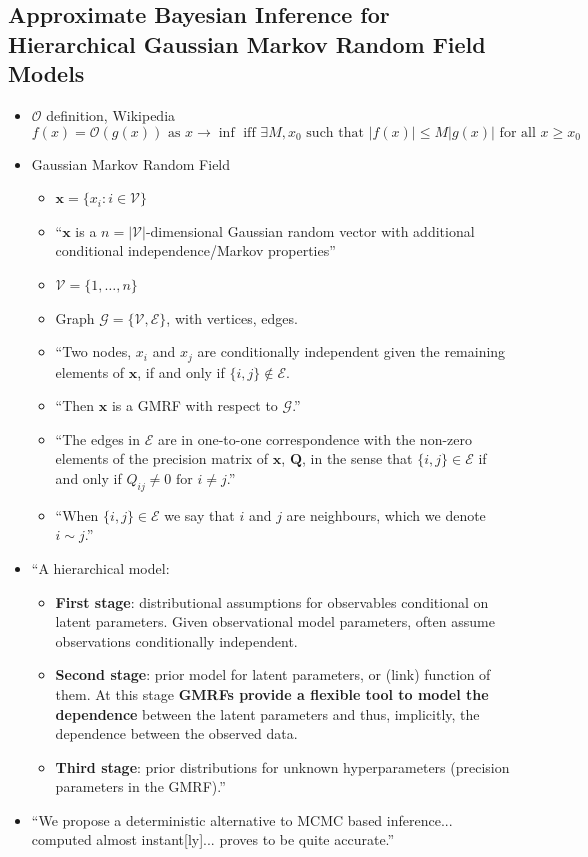\documentclass{article}
\begin{document}
\subsection*{Approximate Bayesian Inference for Hierarchical Gaussian Markov Random Field Models \citep{Rue2007}}
\begin{itemize}
\item $\mathcal{O}$ definition, Wikipedia
$$f(x) = \mathcal{O}(g(x)) \text{ as } x \rightarrow \inf \text{ iff } \exists M, x_{0} \text{ such that } |f(x)| \leq M|g(x)| \text{ for all } x \geq x_{0}$$
\item Gaussian Markov Random Field 
  \begin{itemize}
  \item $\pmb{x} = \{ x_{i}:i \in \mathscr{V} \}$
  \item ``$\pmb{x}$ is a $n = |\mathscr{V}|$-dimensional Gaussian random vector with additional conditional independence/Markov properties'' 
  \item $\mathscr{V} = \{1,\dots,n\}$
  \item Graph $\mathscr{G} = \{ \mathscr{V}, \mathscr{E} \}$, with vertices, edges.
  \item ``Two nodes, $x_{i}$ and $x_{j}$ are conditionally independent given the remaining elements of $\pmb{x}$, if and only if $\{i, j\} \notin \mathscr{E}$.
  \item ``Then $\pmb{x}$ is a GMRF with respect to $\mathscr{G}$.''
  \item ``The edges in $\mathscr{E}$ are in one-to-one correspondence with the non-zero elements of the precision matrix of $\pmb{x}$, $\pmb{Q}$, in the sense that $\{ i, j \} \in \mathscr{E}$ if and only if $Q_{ij} \neq 0 \text{ for } i \neq j$.''
  \item ``When $\{i,j\} \in \mathscr{E}$ we say that $i$ and $j$ are neighbours, which we denote $i \sim j$.''
  \end{itemize}
  
\item ``A hierarchical model:
  \begin{itemize}
  \item {\bf First stage}: distributional assumptions for observables conditional on latent parameters. Given observational model parameters, often assume observations conditionally independent. 
  \item {\bf Second stage}: prior model for latent parameters, or (link) function of them. At this stage {\bf GMRFs provide a flexible tool to model the dependence} between the latent parameters and thus, implicitly, the dependence between the observed data. 
  \item {\bf Third stage}: prior distributions for unknown hyperparameters (precision parameters in the GMRF).''
  \end{itemize}
\item ``We propose a deterministic alternative to MCMC based inference... computed almost instant[ly]... proves to be quite accurate.''
\end{itemize}
\end{document}
